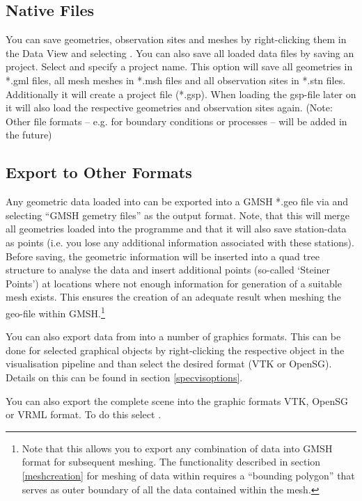 \subsection{Native Files}
You can save geometries, observation sites and meshes by right-clicking them in the Data View and selecting . You can also save all loaded data files by saving an \ogs project. Select  and specify a project name. This option will save all geometries in *.gml files, all mesh meshes in *.msh files and all observation sites in *.stn files. Additionally it will create a project file (*.gsp). When loading the gsp-file later on it will also load the respective geometries and observation sites again. (Note: Other file formats -- e.g. for boundary conditions or processes -- will be added in the future)

\subsection{Export to Other Formats}

Any geometric data loaded into \ogs can be exported into a GMSH *.geo file via  and selecting ``GMSH gemetry files'' as the output format. Note, that this will merge all geometries loaded into the programme and that it will also save station-data as points (i.e. you lose any additional information associated with these stations). Before saving, the geometric information will be inserted into a quad tree structure to analyse the data and insert additional points (so-called `Steiner Points') at locations where not enough information for generation of a suitable mesh exists. This ensures the creation of an adequate result when meshing the geo-file within GMSH.\footnote{Note that this allows you to export any combination of data into GMSH format for subsequent meshing. The functionality described in section \ref{meshcreation} for meshing of data within \ogs requires a ``bounding polygon'' that serves as outer boundary of all the data contained within the mesh.}

\bigskip

You can also export data from \ogs into a number of graphics formats. This can be done for selected graphical objects by right-clicking the respective object in the visualisation pipeline and than select the desired format (VTK or OpenSG). Details on this can be found in section \ref{specvisoptions}.

You can also export the complete scene into the graphic formats VTK, OpenSG or VRML format. To do this select . 